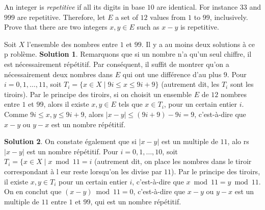 \documentclass[12pt,addpoints]{exam}
\begin{document}
\begin{questions}
\question
An integer is \emph{repetitive} if all its digits in base $10$ are identical. For instance $33$ and $999$ are repetitive. Therefore, let $E$ a set of $12$ values from $1$ to $99$, inclusively. Prove that there are two integers $x,y \in E$ such as $x - y$ is repetitive.
\begin{solution}
Soit $X$ l'ensemble des nombres entre $1$ et $99$. Il y a au moins deux solutions à ce p
roblème.
\textbf{Solution 1}. Remarquons que si un nombre n'a qu'un seul chiffre, il est nécessairement répétitif. Par conséquent, il suffit de montrer qu'on a nécessairement deux nombres dans $E$ qui ont une différence d'au plus $9$. Pour $i = 0,1,\ldots,11$, soit $T_i = \{x \in X \mid 9i \leq x \leq 9i+9\}$ (autrement dit, les $T_i$ sont les tiroirs). Par le principe des tiroirs, si on choisit un ensemble $E$ de $12$ nombres entre $1$ et $99$, alors il existe $x, y \in E$ tels que $x \in T_i$, pour un certain entier $i$. Comme $9i \leq x,y \leq 9i + 9$, alors $|x - y| \leq (9i + 9) - 9i = 9$, c'est-à-dire que $x - y$ ou $y - x$ est un nombre répétitif.

\textbf{Solution 2}. On constate également que si $|x - y|$ est un multiple de $11$, alo rs $|x - y|$ est un nombre répétitif. Pour $i = 0,1,\ldots,10$, soit $T_i = \{x \in X \mid x \bmod 11 = i$ (autrement dit, on place les nombres dans le tiroir correspondant à l eur reste lorsqu'on les divise par $11$). Par le principe des tiroirs, il existe $x,y \in T_i$ pour un certain entier $i$, c'est-à-dire que $x \bmod 11 = y \bmod 11$. On en conclut que $(x - y) \bmod 11 = 0$, c'est-à-dire que $x - y$ ou $y - x$ est un multiple de $11$ entre $1$ et $99$, qui est un nombre répétitif.
\end{solution}



\end{questions}
\end{document}
